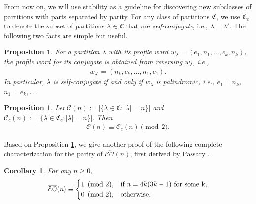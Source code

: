 \documentclass[12pt,reqno]{amsart}
\numberwithin{equation}{section}
\theoremstyle{plain}
\newtheorem{corollary}[theorem]{Corollary}
\newtheorem{proposition}[theorem]{Proposition}
\theoremstyle{definition}
\begin{document}
From now on, we will use stability as a guideline for discovering new subclasses of partitions with parts
separated by parity. For any class of partitions $\mathfrak{C}$, we use $\mathfrak{C}_{c}$ to denote the
subset of partitions $\lambda\in\mathfrak{C}$ that are {\em self-conjugate}, i.e., $\lambda=\lambda'$. The
following two facts are simple but useful.

\begin{proposition}\label{prop:conj and rev}
For a partition $\lambda$ with its profile word $w_{\lambda}=(e_1,n_1,\ldots,e_k,n_k)$, the profile word for
its conjugate is obtained from reversing $w_{\lambda}$, i.e.,
\begin{align*}
w_{\lambda'}=(n_k,e_k,\ldots,n_1,e_1).
\end{align*}
In particular, $\lambda$ is self-conjugate if and only if $w_{\lambda}$ is palindromic, i.e., $e_1=n_k$,
$n_1=e_k,\ldots$.
\end{proposition}

\begin{proposition}\label{Prop:conj}
Let $\mathcal{C}(n):=|\{\lambda\in\mathfrak{C}:|\lambda|=n\}|$ and
$\mathcal{C}_c(n):=|\{\lambda\in\mathfrak{C}_c:|\lambda|=n\}|$. Then
\begin{align}\label{cong:sc-parity}
\mathcal{C}(n)\equiv\mathcal{C}_c(n)\pmod 2.
\end{align}
\end{proposition}

Based on Proposition \ref{Prop:conj}, we give another proof of the following complete characterization for
the parity of $\overline{\mathcal{EO}}(n)$, first derived by Passary \cite[Eq. (2.1.24)]{Pas}.

\begin{corollary}\label{cor:bEOparity}
For any $n\ge 0$,
\begin{align}\label{cong:bEOparity}
\overline{\mathcal{EO}}(n) \equiv \begin{cases}
1 \pmod 2, & \text{if $n=4k(3k-1)$}~\textrm{for~some~}$k$,\\
0 \pmod 2, & \text{otherwise.}
\end{cases}
\end{align}
\end{corollary}
\end{document}
